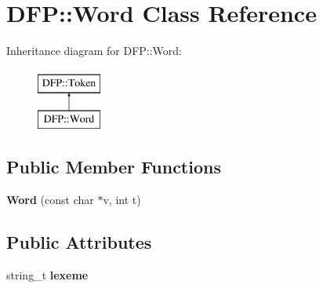 \hypertarget{class_d_f_p_1_1_word}{}\section{D\+FP\+:\+:Word Class Reference}
\label{class_d_f_p_1_1_word}
Inheritance diagram for D\+FP\+:\+:Word\+:\begin{figure}[H]
\begin{center}
\leavevmode
\includegraphics[height=2.000000cm]{class_d_f_p_1_1_word}
\end{center}
\end{figure}
\subsection*{Public Member Functions}
\begin{DoxyCompactItemize}
\item 
{\bfseries Word} (const char $\ast$v, int t)\hypertarget{class_d_f_p_1_1_word_af3baaa310a3edc2e98548364b94b216f}{}\label{class_d_f_p_1_1_word_af3baaa310a3edc2e98548364b94b216f}

\end{DoxyCompactItemize}
\subsection*{Public Attributes}
\begin{DoxyCompactItemize}
\item 
string\+\_\+t {\bfseries lexeme}\hypertarget{class_d_f_p_1_1_word_aba4633664b6a91b0d2ca6e4f0e2f23f2}{}\label{class_d_f_p_1_1_word_aba4633664b6a91b0d2ca6e4f0e2f23f2}

\end{DoxyCompactItemize}
